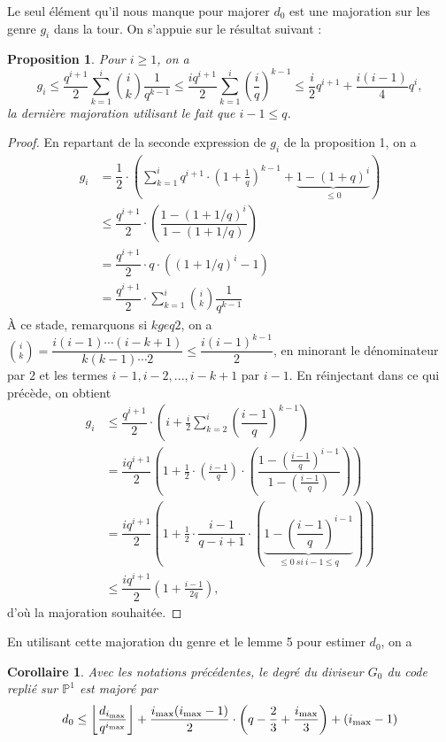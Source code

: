 \documentclass[10pt]{article}
\newtheorem{prop1}{Proposition}[]
\newtheorem{coro1}{Corollaire}[]
\newcommand{\cd}{\cdot}
\newcommand{\ii}{i_{\rm{max}}}
\begin{document}
Le seul élément qu'il nous manque pour majorer $d_0$ est une majoration sur les genre $g_i$ dans la tour. On s'appuie sur le résultat suivant :

\begin{prop1}
Pour $i \geq 1$, on a
\[g_i \leq \dfrac{q^{i+1}}{2} \sum\limits_{k=1}^i \binom{i}{k} \dfrac{1}{q^{k-1}} \leq \dfrac{iq^{i+1}}{2} \sum\limits_{k=1}^i \left(\dfrac{i}{q}\right)^{k-1} \leq \dfrac{i}{2}q^{i+1} + \dfrac{i(i-1)}{4}q^i,\]
la dernière majoration utilisant le fait que $i-1 \leq q$.
\end{prop1}

\begin{proof}
En repartant de la seconde expression de $g_i$ de la proposition 1, on a 
\begin{align*}
g_i  &=\dfrac{1}{2} \cd \left(\sum\limits_{k=1}^i q^{i+1} \cd \left(1+\frac{1}{q}\right)^{k-1} +\underbrace{1 -(1+q)^i}_{\leq 0}\right) \\
	&\leq \dfrac{q^{i+1}}{2} \cd \left(\dfrac{1-(1+1/q)^i}{1-(1+1/q)}\right) \\
	& = \dfrac{q^{i+1}}{2} \cd q \cd ((1+1/q)^i-1) \\
	& = \dfrac{q^{i+1}}{2} \cd \sum\limits_{k=1}^i \binom{i}{k} \dfrac{1}{q^{k-1}}
\end{align*}
À ce stade, remarquons si $k geq 2$, on a $\binom{i}{k} = \dfrac{i(i-1) \cdots (i-k+1)}{k(k-1) \cdots 2} \leq \dfrac{i(i-1)^{k-1}}{2}$, en minorant le dénominateur par $2$ et les termes $i-1,i-2,...,i-k+1$ par $i-1$. En réinjectant dans ce qui précède, on obtient
\begin{align*}
g_i &\leq \dfrac{q^{i+1}}{2} \cd \left( i + \frac{i}{2} \sum\limits_{k=2}^i \left(\dfrac{i-1}{q}\right)^{k-1}\right) \\
	&= \dfrac{iq^{i+1}}{2} \left( 1 + \frac{1}{2} \cd \left(\frac{i-1}{q}\right) \cd \left(\dfrac{1-(\frac{i-1}{q})^{i-1}}{1-(\frac{i-1}{q})}\right)\right) \\
		&= \dfrac{iq^{i+1}}{2} \left( 1 + \frac{1}{2} \cd \dfrac{i-1}{q-i+1} \cd \left(\underbrace{1- \left(\dfrac{i-1}{q}\right)^{i-1}}_{\leq 0 \ si \ i-1 \leq q}\right)\right) \\
	& \leq \dfrac{iq^{i+1}}{2} \left( 1 + \frac{i-1}{2q}\right),
\end{align*}
d'où la majoration souhaitée.
\end{proof}

En utilisant cette majoration du genre et le lemme 5 pour estimer $d_0$, on a 

\begin{coro1}
Avec les notations précédentes, le degré du diviseur $G_0$ du code replié sur $\mathbb{P}^1$ est majoré par 
\[d_0 \leq \left\lfloor \dfrac{d_{\ii}}{q^{\ii}}\right\rfloor + \dfrac{\ii(\ii-1)}{2}\cd \left(q-\frac{2}{3} + \frac{\ii}{3}\right) + (\ii-1)  \]
\end{coro1}
\end{document}
